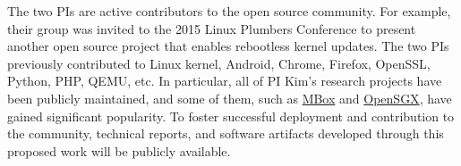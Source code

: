 The two PIs are active contributors to the open source community.
For example, their group was invited to the 2015 Linux
Plumbers Conference to present another open source project that
enables rebootless kernel updates.
%
The two PIs previously contributed to Linux kernel, Android, Chrome,
Firefox, OpenSSL, Python, PHP, QEMU, etc. In particular, all of PI
Kim's research projects have been publicly maintained, and some of
them, such as \href{https://github.com/tsgates/mbox}{MBox}
and \href{https://github.com/sslab-gatech/opensgx}{OpenSGX},
have gained significant popularity.
%
To foster successful deployment and contribution to the
community, technical reports, and software artifacts developed through
this proposed work will be publicly available.

